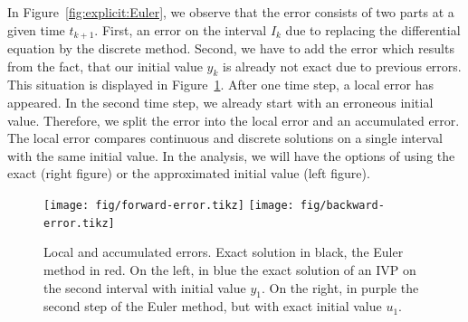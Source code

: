 \begin{remark}
  In Figure~\ref{fig:explicit:Euler}, we observe that the error
  consists of two parts at a given time $t_{k+1}$. First, an error on
  the interval $I_k$ due to replacing the differential equation by the
  discrete method. Second, we have to add the error which results from
  the fact, that our initial value $y_k$ is already not exact due to
  previous errors. This situation is displayed in
  Figure~\ref{fig:forward-errors}. After one time step, a local error
  has appeared. In the second time step, we already start with an
  erroneous initial value. Therefore, we split the error into the
  local error and an accumulated error. The local error compares
  continuous and discrete solutions on a single interval with the same
  initial value. In the analysis, we will have the options of using
  the exact (right figure) or the approximated initial value (left figure).

  \begin{figure}[tp]
    \centering
    \texttt{[image: fig/forward-error.tikz]}
    \texttt{[image: fig/backward-error.tikz]}
    \caption{Local and accumulated errors. Exact solution in black,
      the Euler method in red. On the left, in blue the exact solution
      of an IVP on the second interval with initial value $y_1$. On
      the right, in purple the second step of the Euler method, but with
      exact initial value $u_1$.}
    \label{fig:forward-errors}
  \end{figure}
\end{remark}



